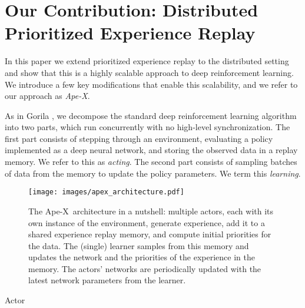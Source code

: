 \documentclass{article} \PassOptionsToPackage{usenames,dvipsnames}{xcolor}
\def\apex{Ape-X}
\def\smallcaption#1{\caption{\small #1}\vspace{-0.4cm}}
\begin{document}
\section{Our Contribution: Distributed Prioritized Experience Replay}

In this paper we extend prioritized experience replay to the distributed setting and show that this is a highly scalable approach to deep reinforcement learning. We introduce a few key modifications that enable this scalability, and we refer to our approach as \emph{\apex}.

As in Gorila \citep{gorila}, we decompose the standard deep reinforcement learning algorithm into two parts, which run concurrently with no high-level synchronization.  The first part consists of stepping through an environment, evaluating a policy implemented as a deep neural network, and storing the observed data in a replay memory. We refer to this as \emph{acting}. The second part consists of sampling batches of data from the memory to update the policy parameters. We term this \emph{learning}. 

\begin{figure}[t!]
\centerline{
\texttt{[image: images/apex\_architecture.pdf]}
}
\smallcaption{
The \apex\ architecture in a nutshell: multiple actors, each with its own instance of the environment, generate experience, add it to a shared experience replay memory, and compute initial priorities for the data. The (single) learner samples from this memory and updates the network and the priorities of the experience in the memory. The actors' networks are periodically updated with the latest network parameters from the learner.
}\label{fig:architecture}

\end{figure}

\begin{algorithm}[t!]
\caption{Actor}\label{acting_worker}
\small{
\begin{algorithmic}[1]
\State  {} \ 
\State  {} \  
\State {}
\State {}
\State {}\ 
\If{} 
    \State  {}
    \State  {}
    \State  {}
\EndIf
\State  {}
\EndFor
\EndProcedure
\end{algorithmic}
}
\label{algo-actor}
\end{algorithm}
\end{document}
